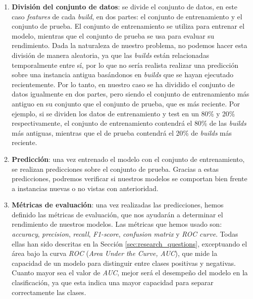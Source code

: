\begin{enumerate}
    \item \textbf{División del conjunto de datos}: se divide el conjunto de datos, en este caso
    \textit{features} de cada \textit{build}, en dos partes: el conjunto de entrenamiento y el
    conjunto de prueba. El conjunto de entrenamiento se utiliza para entrenar el modelo, mientras
    que el conjunto de prueba se usa para evaluar su rendimiento. Dada la naturaleza de nuestro
    problema, no podemos hacer esta división de manera aleatoria, ya que las \textit{builds} están
    relacionadas temporalmente entre sí, por lo que no sería realista realizar una predicción
    sobre una instancia antigua basándonos en \textit{builds} que se hayan ejecutado recientemente.
    Por lo tanto, en nuestro caso se ha dividido el conjunto de datos igualmente en dos partes,
    pero siendo el conjunto de entrenamiento más antiguo en su conjunto que el conjunto de prueba,
    que es más reciente. Por ejemplo, si se dividen los datos de entrenamiento y test en un 80\% y
    20\% respectivamente, el conjunto de entrenamiento contendrá el 80\% de las \textit{builds}
    más antiguas, mientras que el de prueba contendrá el 20\% de \textit{builds} más reciente.\\
    \item \textbf{Predicción}: una vez entrenado el modelo con el conjunto de entrenamiento, se
    realizan predicciones sobre el conjunto de prueba. Gracias a estas predicciones, podremos
    verificar si nuestros modelos se comportan bien frente a instancias nuevas o no vistas con
    anterioridad.\\
    \item \textbf{Métricas de evaluación}: una vez realizadas las predicciones, hemos definido
    las métricas de evaluación, que nos ayudarán a determinar el rendimiento de nuestros modelos.
    Las métricas que hemos usado son: \textit{accuracy}, \textit{precision}, \textit{recall},
    \textit{F1-score}, \textit{confusion matrix} y \textit{ROC curve}. Todas
    ellas han sido descritas en la Sección \ref{sec:research_questions}, exceptuando el área
    bajo la curva \textit{ROC} (\textit{Area Under the Curve, AUC}), que mide la capacidad de
    un modelo para distinguir entre clases positivas y negativas. Cuanto mayor sea el valor de
    \textit{AUC}, mejor será el desempeño del modelo en la clasificación, ya que esta indica una
    mayor capacidad para separar correctamente las clases.
\end{enumerate}

